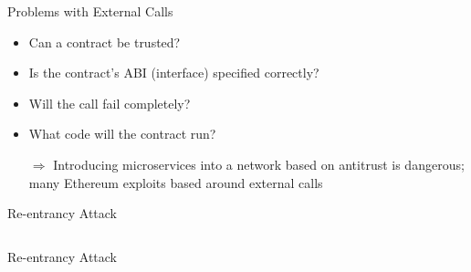 \documentclass[aspectratio=169]{beamer}
\begin{document}
\begin{frame}{Problems with External Calls}
    \begin{itemize}
        \item Can a contract be trusted?
        \item Is the contract's ABI (interface) specified correctly?
        \item Will the call fail completely?
        \item What code will the contract run?
        \item[$\Rightarrow$] Introducing microservices into a network based on antitrust is dangerous; many Ethereum exploits based around external calls
    \end{itemize}
\end{frame}

\begin{frame}{Re-entrancy Attack}
    \inputminted{swift}{code/reentrancy.flint}
\end{frame}

\begin{frame}{Re-entrancy Attack}
    \inputminted{swift}{code/reentrancy2.flint}
\end{frame}
\end{document}
